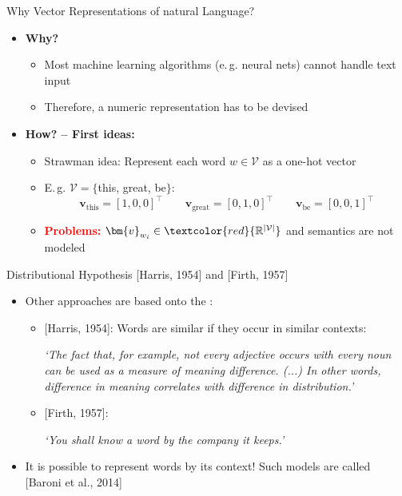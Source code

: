 \begin{frame}{Why Vector Representations of natural Language?}{}
	\begin{itemize}
		\item \textbf{Why?}
		\begin{itemize}
			\item Most machine learning algorithms (e.\,g. neural nets) cannot handle text input
			\item Therefore, a numeric representation has to be devised
		\end{itemize}
		\item{\textbf{How? -- First ideas:}}
		\begin{itemize}
			\item Strawman idea: Represent each word $w \in \mathcal{V}$ as a one-hot vector
			\item E.\,g. $\mathcal{V} = \{$this, great, be$\}$:
			\begin{equation*}	
				\bm{v}_{\text{this}} = [1,0,0]^{\intercal} \qquad
				\bm{v}_{\text{great}} = [0,1,0]^{\intercal} \qquad
				\bm{v}_{\text{be}} = [0,0,1]^{\intercal}
			\end{equation*}
			\item \textcolor{red}{\textbf{Problems:}} $\bm{v}_{w_i} \in \textcolor{red}{\mathbb{R}^{\vert \mathcal{V} \vert}}$
			 	and semantics are not modeled
		\end{itemize}
	\end{itemize}
\end{frame}


\begin{frame}{Distributional Hypothesis [Harris, 1954] and [Firth, 1957]}{}
	\begin{itemize}
		\item Other approaches are based onto the :
		\begin{itemize}
			\item{} [Harris, 1954]: Words are similar if they occur in similar contexts:
			\vspace*{2mm}
			\begin{center}
				\textit{`The fact that, for example, not every adjective occurs with every noun can be used as a measure
				of meaning  difference. (...) In other words, difference in meaning correlates with difference in distribution.'}
			\end{center}
			\vspace*{2mm}
			\item{} [Firth, 1957]:
			\vspace*{2mm}
			\begin{center}
				\textit{`You shall know a word by the company it keeps.'}
			\end{center}
			\vspace*{2mm}
		\end{itemize}
		\item It is possible to represent words by its context! Such models are called 
			[Baroni et al., 2014]
	\end{itemize}
\end{frame}


